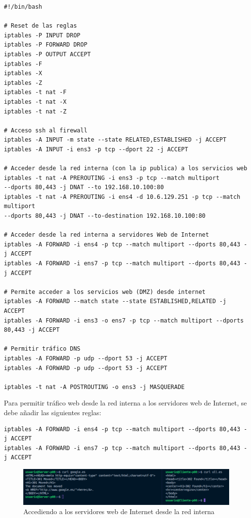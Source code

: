 \documentclass[11pt]{report} %
\begin{document}
\begin{verbatim}
#!/bin/bash

# Reset de las reglas
iptables -P INPUT DROP
iptables -P FORWARD DROP
iptables -P OUTPUT ACCEPT
iptables -F
iptables -X
iptables -Z
iptables -t nat -F
iptables -t nat -X
iptables -t nat -Z

# Acceso ssh al firewall
iptables -A INPUT -m state --state RELATED,ESTABLISHED -j ACCEPT
iptables -A INPUT -i ens3 -p tcp --dport 22 -j ACCEPT

# Acceder desde la red interna (con la ip publica) a los servicios web
iptables -t nat -A PREROUTING -i ens3 -p tcp --match multiport 
--dports 80,443 -j DNAT --to 192.168.10.100:80 
iptables -t nat -A PREROUTING -i ens4 -d 10.6.129.251 -p tcp --match multiport 
--dports 80,443 -j DNAT --to-destination 192.168.10.100:80 

# Acceder desde la red interna a servidores Web de Internet
iptables -A FORWARD -i ens4 -p tcp --match multiport --dports 80,443 -j ACCEPT
iptables -A FORWARD -i ens7 -p tcp --match multiport --dports 80,443 -j ACCEPT

# Permite acceder a los servicios web (DMZ) desde internet
iptables -A FORWARD --match state --state ESTABLISHED,RELATED -j ACCEPT
iptables -A FORWARD -i ens3 -o ens7 -p tcp --match multiport --dports 80,443 -j ACCEPT

# Permitir tráfico DNS
iptables -A FORWARD -p udp --dport 53 -j ACCEPT
iptables -A FORWARD -p udp --dport 53 -j ACCEPT

iptables -t nat -A POSTROUTING -o ens3 -j MASQUERADE
\end{verbatim}

\cleardoublepage

Para permitir tráfico web desde la red interna a los servidores web de Internet, se debe añadir las siguientes reglas:
\begin{verbatim}
iptables -A FORWARD -i ens4 -p tcp --match multiport --dports 80,443 -j ACCEPT
iptables -A FORWARD -i ens7 -p tcp --match multiport --dports 80,443 -j ACCEPT
\end{verbatim}

\begin{figure}[H]
  \centering
  \includegraphics[scale=0.4]{img/web_internet.png}
  \caption{Accediendo a los servidores web de Internet desde la red interna}
  \label{fig:permitir tráfico web desde la red interna a los servidores web de Internet}
\end{figure}
\end{document}
